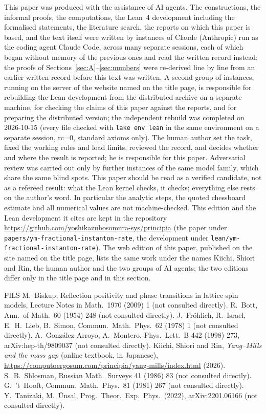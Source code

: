 \documentclass[11pt,a4paper]{article}
\theoremstyle{definition}
\theoremstyle{remark}
\newcommand{\code}[1]{\texttt{#1}}
\begin{document}
This paper was produced with the assistance of AI agents. The constructions, the informal proofs, the computations, the Lean~4 development including the formalised statements, the literature search, the reports on which this paper is based, and the text itself were written by instances of Claude (Anthropic) run as the coding agent Claude Code, across many separate sessions, each of which began without memory of the previous ones and read the written record instead; the proofs of Sections~\ref{sec:A}--\ref{sec:numbers} were re-derived line by line from an earlier written record before this text was written. A second group of instances, running on the server of the website named on the title page, is responsible for rebuilding the Lean development from the distributed archive on a separate machine, for checking the claims of this paper against the reports, and for preparing the distributed version; the independent rebuild was completed on 2026-10-15 (every file checked with \code{lake env lean} in the same environment on a separate session, rc=0, standard axioms only). The human author set the task, fixed the working rules and load limits, reviewed the record, and decides whether and where the result is reported; he is responsible for this paper. Adversarial review was carried out only by further instances of the same model family, which share the same blind spots. This paper should be read as a verified candidate, not as a refereed result: what the Lean kernel checks, it checks; everything else rests on the author's word. In particular the analytic steps, the quoted chessboard estimate and all numerical values are not machine-checked. This edition and the Lean development it cites are kept in the repository \url{https://github.com/yoshikazuhosomura-sys/principia} (the paper under \texttt{papers/\allowbreak{}ym-fractional-instanton-rate}, the development under \texttt{lean/\allowbreak{}ym-fractional-instanton-rate}). The web edition of this paper, published on the site named on the title page, lists the same work under the names Kiichi, Shiori and Rin, the human author and the two groups of AI agents; the two editions differ only in the title page and in this section.

\begin{thebibliography}{FILS}
 M.~Biskup, Reflection positivity and phase transitions in lattice spin models, Lecture Notes in Math.\ 1970 (2009) 1 (not consulted directly).
 R.~Bott, Ann.\ of Math.\ 60 (1954) 248 (not consulted directly).
 J.~Fr\"ohlich, R.~Israel, E.~H.~Lieb, B.~Simon, Commun.\ Math.\ Phys.\ 62 (1978) 1 (not consulted directly).
 A.~Gonz\'alez-Arroyo, A.~Montero, Phys.\ Lett.\ B 442 (1998) 273, arXiv:hep-th/9809037 (not consulted directly).
 Kiichi, Shiori and Rin, \emph{Yang--Mills and the mass gap} (online textbook, in Japanese), \url{https://computoergosum.com/principia/yang-mills/index.html} (2026).
 S.~B.~Shlosman, Russian Math.\ Surveys 41 (1986) 83 (not consulted directly).
 G.~'t~Hooft, Commun.\ Math.\ Phys.\ 81 (1981) 267 (not consulted directly).
 Y.~Tanizaki, M.~\"Unsal, Prog.\ Theor.\ Exp.\ Phys.\ (2022), arXiv:2201.06166 (not consulted directly).
\end{thebibliography}
\end{document}
